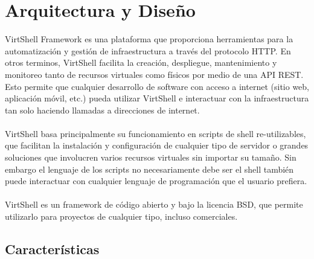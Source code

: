 \chapter{Arquitectura y Diseño}
\label{Arquitectura}

VirtShell Framework es una plataforma que proporciona herramientas para la automatización y gestión de infraestructura a través del protocolo HTTP. En otros terminos, VirtShell facilita la creación, despliegue, mantenimiento y monitoreo tanto de recursos virtuales como físicos por medio de una API REST. Esto permite que cualquier desarrollo de software con acceso a internet (sitio web, aplicación móvil, etc.) pueda utilizar VirtShell e interactuar con la infraestructura tan solo haciendo llamadas a direcciones de internet. \\
\\
VirtShell basa principalmente su funcionamiento en scripts de shell re-utilizables, que facilitan la instalación y configuración de cualquier tipo de servidor o grandes soluciones que involucren varios recursos virtuales sin importar su tamaño. Sin embargo el lenguaje de los scripts no necesariamente debe ser el shell también puede interactuar con cualquier lenguaje de programación que el usuario prefiera.\\
\\
VirtShell es un framework de código abierto y bajo la licencia BSD, que permite utilizarlo para proyectos de cualquier tipo, incluso comerciales. 

\section{Características}

